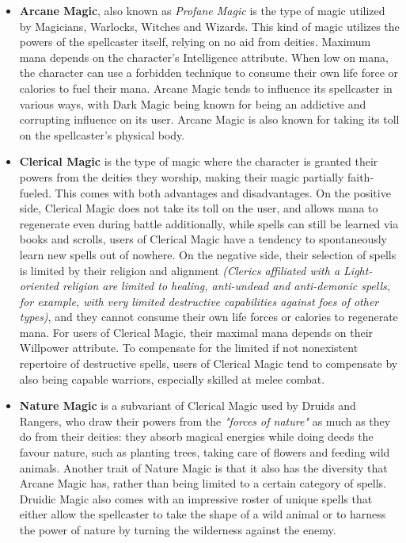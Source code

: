 \documentclass[openany,11pt,a4paper]{book}
\begin{document}
\begin{itemize}
\item \textbf{Arcane Magic}, also known as \textit{Profane Magic} is the type of magic utilized by Magicians, Warlocks, Witches and Wizards. This kind of magic utilizes the powers of the spellcaster itself, relying on no aid from deities. Maximum mana depends on the character's Intelligence attribute. When low on mana, the character can use a forbidden technique to consume their own life force or calories to fuel their mana. Arcane Magic tends to influence its spellcaster in various ways, with Dark Magic being known for being an addictive and corrupting influence on its user. Arcane Magic is also known for taking its toll on the spellcaster's physical body.
\item \textbf{Clerical Magic} is the type of magic where the character is granted their powers from the deities they worship, making their magic partially faith-fueled. This comes with both advantages and disadvantages. On the positive side, Clerical Magic does not take its toll on the user, and allows mana to regenerate even during battle \textemdash additionally, while spells can still be learned via books and scrolls, users of Clerical Magic have a tendency to spontaneously learn new spells out of nowhere. On the negative side, their selection of spells is limited by their religion and alignment \textit{(Clerics affiliated with a Light-oriented religion are limited to healing, anti-undead and anti-demonic spells, for example, with very limited destructive capabilities against foes of other types)}, and they cannot consume their own life forces or calories to regenerate mana. For users of Clerical Magic, their maximal mana depends on their Willpower attribute. To compensate for the limited \textemdash if not nonexistent \textemdash repertoire of destructive spells, users of Clerical Magic tend to compensate by also being capable warriors, especially skilled at melee combat. 
\item \textbf{Nature Magic} is a subvariant of Clerical Magic used by Druids and Rangers, who draw their powers from the \textit{"forces of nature"} as much as they do from their deities: they absorb magical energies while doing deeds the favour nature, such as planting trees, taking care of flowers and feeding wild animals. Another trait of Nature Magic is that it also has the diversity that Arcane Magic has, rather than being limited to a certain category of spells. Druidic Magic also comes with an impressive roster of unique spells that either allow the spellcaster to take the shape of a wild animal or to harness the power of nature by turning the wilderness against the enemy.
\end{itemize}
\end{document}
